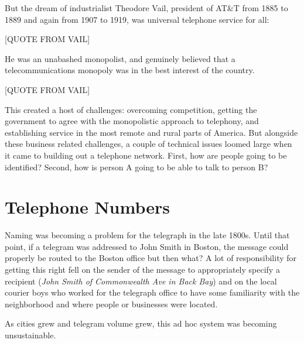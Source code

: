 \documentclass[UTF8]{book}
\begin{document}
\begin{CJK}{UTF8}{gbsn}
But the dream of industrialist Theodore Vail, president of AT\&T from 1885 to 1889 and again from 1907 to 1919, was universal telephone service for all:

[QUOTE FROM VAIL]

He was an unabashed monopolist, and genuinely believed that a telecommunications monopoly was in the best interest of the country.

[QUOTE FROM VAIL]

This created a host of challenges: overcoming competition, getting the government to agree with the monopolistic approach to telephony, and establishing service in the most remote and rural parts of America. But alongside these business related challenges, a couple of technical issues loomed large when it came to building out a telephone network. First, how are people going to be identified? Second, how is person A going to be able to talk to person B?

\section{Telephone Numbers}

Naming was becoming a problem for the telegraph in the late 1800s. Until that point, if a telegram was addressed to John Smith in Boston, the message could properly be routed to the Boston office but then what? A lot of responsibility for getting this right fell on the sender of the message to appropriately specify a recipient (\emph{John Smith of Commonwealth Ave in Back Bay}) and on the local courier boys who worked for the telegraph office to have some familiarity with the neighborhood and where people or businesses were located.

As cities grew and telegram volume grew, this ad hoc system was becoming unsustainable.



\end{CJK}
\end{document}

